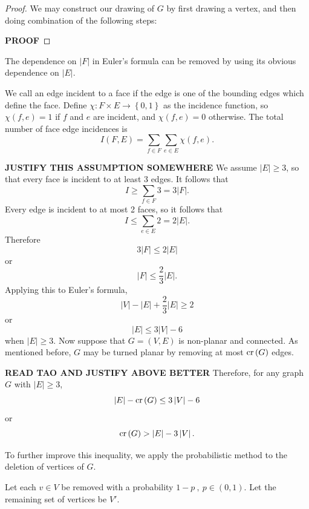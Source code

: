 \documentclass[12pt,reqno]{amsart}
\begin{document}
\begin{proof}
We may construct our drawing of \(G\) by first drawing a vertex, and then doing combination of the following steps: 

\textbf{PROOF}
\end{proof}

The dependence on \(\left\lvert F \right\rvert \) in Euler's formula can be removed by using
its obvious dependence on \(\left\lvert E \right\rvert \). 

We call an edge incident to a face if the edge is one of the bounding edges which define the face. 
Define \(\chi : F \times E \to \left\{ 0,1 \right\} \) as the incidence function, so
\(\chi(f,e) = 1\) if \(f\) and \(e\) are incident, and \(\chi(f,e) = 0\) otherwise.
The total number of face edge incidences is
\[
    I(F,E) = \sum_{f\in F} \sum _{e \in E} \chi(f,e)
.\]

\textbf{JUSTIFY THIS ASSUMPTION SOMEWHERE}
We assume \(\left\lvert E \right\rvert  \geq 3\), so that every face is incident to at least 3 edges.
It follows that
\[
    I \geq \sum _{f \in F} 3 = 3 \left\lvert F \right\rvert 
.\]
Every edge is incident to at most 2 faces, so it follows that
\[
    I \leq \sum _{e \in E} 2 = 2 \left\lvert E \right\rvert 
.\]
Therefore
\[
    3 \left\lvert F \right\rvert \leq 2 \left\lvert E \right\rvert 
\]
or
\[
    \left\lvert F \right\rvert \leq \frac{2}{3} \left\lvert E \right\rvert 
.\]
Applying this to Euler's formula,
\[
    \left\lvert V \right\rvert - \left\lvert E \right\rvert + \frac{2}{3} \left\lvert E \right\rvert \geq 2
\]
or
\[
    \left\lvert E \right\rvert \leq 3 \left\lvert V \right\rvert -6
\]
when \(\left\lvert E \right\rvert \geq 3\).
Now suppose that \(G = (V,E)\) is non-planar and connected. As mentioned before, \(G\) may be turned planar by removing
at most \(\operatorname{cr}\left( G \right) \) edges.

\textbf{READ TAO AND JUSTIFY ABOVE BETTER}
Therefore, for any graph \(G\) with \(\left\lvert E \right\rvert  \geq 3\),
\[
    \left\lvert E \right\rvert - \operatorname{cr}\left( G \right) \leq 3 \left\lvert V \right\rvert - 6
\]
or
\[
    \operatorname{cr}\left( G \right) > \left\lvert E \right\rvert - 3 \left\lvert V \right\rvert 
.\]

To further improve this inequality, we apply the probabilistic method
to the deletion of vertices of \(G\).

Let each \(v \in V\) be
removed with a probability \(1-p~,~  p \in (0,1)\). Let the remaining set of vertices be \(V'\). 
\end{document}
